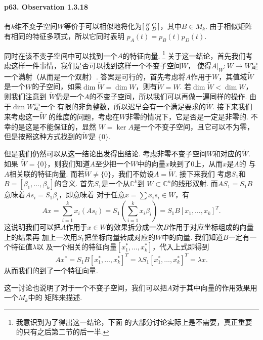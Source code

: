   \paragraph{p63. Observation 1.3.18}
    有$k$维不变子空间$W$等价于可以相似地将化为$\begin{bsmallmatrix}B & C \\ 0 & D
    \end{bsmallmatrix}$，其中$B\in M_k$. 由于相似矩阵有相同的特征多项式，所以它同时表明
    $p_A(t)=p_B(t)p_D(t)$. \par
    同时在该不变子空间中可以找到一个$A$的特征向量. \footnote{我意识到为了得出这一结论，下面
    的大部分讨论实际上是不需要，真正重要的只有之后第二节的后一半. }
    关于这一结论，首先我们考虑这样一件事情，我们是否可以找到这样一个不变子空间$W$，
    使得$A|_W:W\to W$是一个满射（从而是一个双射）. 
    答案是可行的，首先考虑将$A$作用于$W$，其值域$\tilde{W}$是一个$W$的子空间，如果$\dim
    \tilde{W}=\dim W$，则有$\tilde{W}=W$. 若$\dim\tilde{W}<\dim W$，则我们注意到
    $\tilde{W}$仍是一个$A$的不变子空间，所以我们可以再做一遍同样的操作. 由于$\dim W$是一个
    有限的非负整数，所以迟早会有一个满足要求的$\tilde{W}$. 接下来我们来考虑这一$\tilde{W}$
    的维度的问题，考虑在$W$非零的情况下，它是否是一定是非零的. 不幸的是这是不能保证的，显然
    $W=\ker A$是一个不变子空间，且它可以不为零，但是按照这种方式找到的$\tilde{W}$是
    $\{0\}$. \par
    但是我们仍然可以从这一结论出发得出结论. 考虑非零不变子空间$W$和对应的$\tilde{W}$. 如果
    $\tilde{W}=\{0\}$，则我们知道$A$至少把一个$W$中的向量$x$映到了$0$上，从而$x$是$A$的
    与$A$相关联的特征向量. 而若$\tilde{W}\ne\{0\}$，我们不妨设$A=\tilde{W}$. 接下来我们
    考虑$S_1$和$B=[\beta_1,\dots,\beta_k]$的含义. 首先$S_1$是一个从$\mathbb{C}^k$到
    $W\subset\mathbb{C}^n$的线形双射. 而$AS_1=S_1B$意味着$As_i=S_1\beta_i$，即意味着
    对于任意$x=\sum x_is_i \in W$，有
    \[
      Ax = \sum_{i=1}^k x_i(As_i) = 
      S_1\left( \sum_{i=1}^k x_i\beta_i \right) = S_1B[x_1,\dots,x_k]^T.
    \]
    这说明我们可以把$A$作用于$x\in W$的效果拆分成一次$B$作用于对应坐标组成的向量上的结果再
    加上一次用$S_1$把坐标向量转成对应的$W$中的向量. 我们知道$B$一定有一个特征值$\lambda$以
    及一个相关的特征向量$[x_1^*, \dots, x_k^*]$，代入上式即得到
    \[
      Ax^*= S_1B[x_1^*,\dots,x_k^*]^T = \lambda S_1[x_1^*,\dots,x_k^*]^T
      =\lambda x.
    \]
    从而我们的到了一个特征向量. \par
    这一讨论也说明了对于一个不变子空间，我们可以把$A$对于其中向量的作用效果用一个$M_k$中的
    矩阵来描述. 
